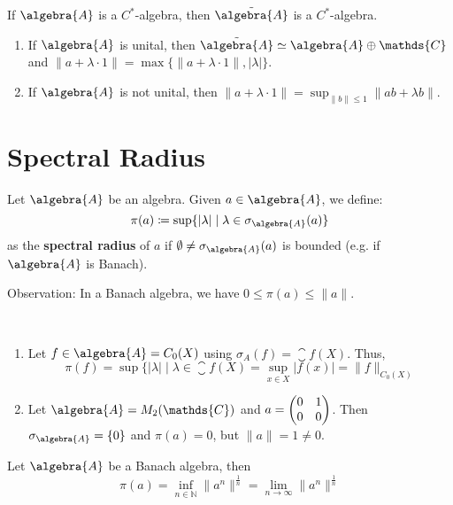 \documentclass[a4paper]{article}
\begin{document}
\begin{remark}
	If $\algebra{A}$ is a $C^*$-algebra, then $\tilde{\algebra{A}}$ is a $C^*$-algebra.
	\begin{enumerate}
		\item If $ \algebra{A}$ is unital, then $\tilde{\algebra{A}} \simeq \algebra{A} \oplus \mathds{C}$ and $\|a + \lambda \cdot 1\| = \max\{\|a + \lambda \cdot 1\|, |\lambda|\}$.
		\item If $\algebra{A}$ is not unital, then $\|a + \lambda \cdot 1\| = \sup_{\|b\| \leq 1} \|ab + \lambda b\|$.
	\end{enumerate}
\end{remark}

\section{Spectral Radius}

\begin{definition}
	Let $\algebra{A}$ be an algebra. Given $a \in \algebra{A}$, we define:
	\begin{equation*}
		\pi(a) \coloneq \sup \{ |\lambda| \mid \lambda \in \sigma_\algebra{A}(a) \}
	\end{equation*}
	as the \textbf{spectral radius} of $a$ if $\emptyset \neq \sigma_\algebra{A}(a)$ is bounded (e.g. if $\algebra{A}$ is Banach).
\end{definition}

Observation: In a Banach algebra, we have $0 \leq \pi(a) \leq \|a\|$.

\begin{example}~
	\begin{enumerate}
		\item Let $f \in \algebra{A} = C_0(X)$ using $\sigma_A(f) = \closure{f(X)}$. Thus,
		      \begin{equation*}
			      \pi(f) = \sup \{ |\lambda| \mid \lambda \in \closure{f(X)} = \sup_{x \in X} |f(x)| = \|f\|_{C_0(X)}
		      \end{equation*}
		\item Let $\algebra{A} = M_2(\mathds{C})$ and $a = \left(\begin{matrix}0 & 1 \\ 0 & 0\end{matrix}\right)$. Then $\sigma_\algebra{A} = \{0\}$ and $\pi(a) = 0$, but $\|a\| = 1 \neq 0$.
	\end{enumerate}
\end{example}

\begin{theorem}
	Let $\algebra{A}$ be a Banach algebra, then
	\begin{equation*}
		\pi(a) = \inf_{n \in \mathds{N}} \|a^n\|^{\frac{1}{n}} = \lim_{n \to \infty} \|a^n\|^{\frac{1}{n}}
	\end{equation*}
\end{theorem}
\end{document}
